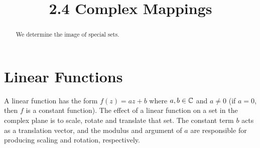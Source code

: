 \documentclass[handout]{ximera}
\title{2.4 Complex Mappings}
\begin{document}
\begin{abstract}
We determine the image of special sets.
\end{abstract}

\maketitle

\section{Linear Functions}
A linear function has the form $f(z) = az+b$ where $a, b \in \mathbb C$ and $a \neq 0$ (if $a=0$, then $f$ is a constant function).
The effect of a linear function on a set in the complex plane is to scale, rotate and translate that set.  The constant term $b$ acts as a translation vector, 
and the modulus and argument of $a$ are responsible for producing scaling and rotation, respectively.
\end{document}
